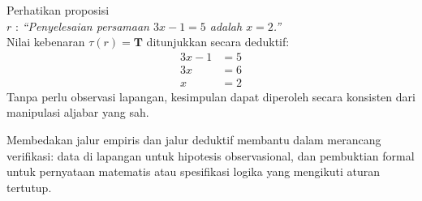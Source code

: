 \begin{contoh}
Perhatikan proposisi \\
\indent $r$ : \textit{``Penyelesaian persamaan $3x - 1 = 5$ adalah $x = 2$.''}\\
Nilai kebenaran $\tau(r) = \mathbf{T}$ ditunjukkan secara deduktif:
\begin{align*}
    3x - 1 &= 5 \\
    3x &= 6 \\
    x &= 2
\end{align*}
Tanpa perlu observasi lapangan, kesimpulan dapat diperoleh secara konsisten dari manipulasi aljabar yang sah.
\end{contoh}

Membedakan jalur empiris dan jalur deduktif membantu dalam merancang verifikasi: data di lapangan untuk hipotesis observasional, dan pembuktian formal untuk pernyataan matematis atau spesifikasi logika yang mengikuti aturan tertutup.
